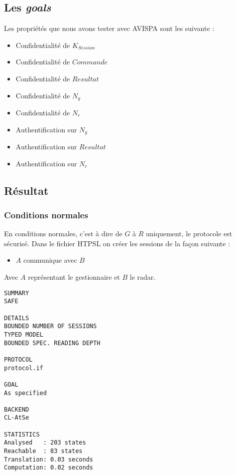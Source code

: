 \documentclass[]{scrartcl}
\begin{document}
\subsection{Les \textit{goals}}

Les propriétés que nous avons tester avec AVISPA sont les suivante : 
\begin{itemize}
	\item Confidentialité de $K_{Session}$
	\item Confidentialité de $Commande$
	\item Confidentialité de $Resultat$
	\item Confidentialité de $N_{g}$
	\item Confidentialité de $N_{r}$
	\item Authentification sur $N_{g}$
	\item Authentification sur $Resultat$
	\item Authentification sur $N_{r}$
	
\end{itemize}

\subsection{Résultat}

\subsubsection{Conditions normales}

En conditions normales, c'est à dire de $G$ à $R$ uniquement, le protocole est sécurisé. Dans le fichier HTPSL on créer les sessions de la façon suivante :
\begin{itemize}
	\item $A$ communique avec $B$
\end{itemize}
Avec $A$ représentant le gestionnaire et $B$ le radar.
\begin{lstlisting}[caption=Résultat d'éxécution - Conditions normales ]
SUMMARY
SAFE

DETAILS
BOUNDED NUMBER OF SESSIONS
TYPED MODEL
BOUNDED SPEC. READING DEPTH

PROTOCOL
protocol.if

GOAL
As specified

BACKEND
CL-AtSe

STATISTICS
Analysed   : 203 states
Reachable  : 83 states
Translation: 0.03 seconds
Computation: 0.02 seconds
\end{lstlisting}
\end{document}
